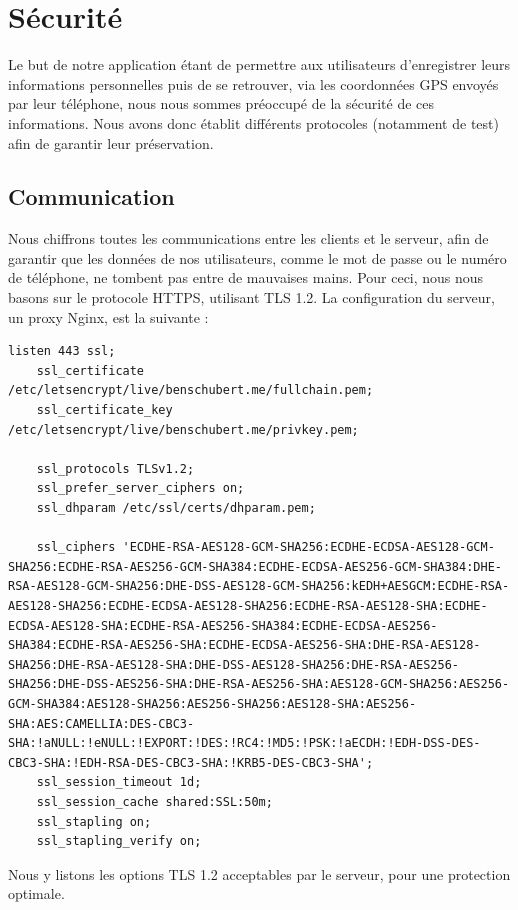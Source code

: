 \documentclass[french]{article}
\begin{document}
	\section{Sécurité}
	
	Le but de notre application étant de permettre aux utilisateurs d'enregistrer leurs informations personnelles puis de se retrouver, via les coordonnées GPS envoyés par leur téléphone, nous nous sommes préoccupé de la sécurité de ces informations. Nous avons donc établit différents protocoles (notamment de test) afin de garantir leur préservation.
	
	\subsection{Communication}
	
	Nous chiffrons toutes les communications entre les clients et le serveur, afin de garantir que les données de nos utilisateurs, comme le mot de passe ou le numéro de téléphone, ne tombent pas entre de mauvaises mains. Pour ceci, nous nous basons sur le protocole HTTPS, utilisant TLS 1.2. La configuration du serveur, un proxy Nginx, est la suivante :
	
	\begin{lstlisting}[style=py]
	listen 443 ssl;
	ssl_certificate /etc/letsencrypt/live/benschubert.me/fullchain.pem;
	ssl_certificate_key /etc/letsencrypt/live/benschubert.me/privkey.pem;
	
	ssl_protocols TLSv1.2;
	ssl_prefer_server_ciphers on;
	ssl_dhparam /etc/ssl/certs/dhparam.pem;
	
	ssl_ciphers 'ECDHE-RSA-AES128-GCM-SHA256:ECDHE-ECDSA-AES128-GCM-SHA256:ECDHE-RSA-AES256-GCM-SHA384:ECDHE-ECDSA-AES256-GCM-SHA384:DHE-RSA-AES128-GCM-SHA256:DHE-DSS-AES128-GCM-SHA256:kEDH+AESGCM:ECDHE-RSA-AES128-SHA256:ECDHE-ECDSA-AES128-SHA256:ECDHE-RSA-AES128-SHA:ECDHE-ECDSA-AES128-SHA:ECDHE-RSA-AES256-SHA384:ECDHE-ECDSA-AES256-SHA384:ECDHE-RSA-AES256-SHA:ECDHE-ECDSA-AES256-SHA:DHE-RSA-AES128-SHA256:DHE-RSA-AES128-SHA:DHE-DSS-AES128-SHA256:DHE-RSA-AES256-SHA256:DHE-DSS-AES256-SHA:DHE-RSA-AES256-SHA:AES128-GCM-SHA256:AES256-GCM-SHA384:AES128-SHA256:AES256-SHA256:AES128-SHA:AES256-SHA:AES:CAMELLIA:DES-CBC3-SHA:!aNULL:!eNULL:!EXPORT:!DES:!RC4:!MD5:!PSK:!aECDH:!EDH-DSS-DES-CBC3-SHA:!EDH-RSA-DES-CBC3-SHA:!KRB5-DES-CBC3-SHA';
	ssl_session_timeout 1d;
	ssl_session_cache shared:SSL:50m;
	ssl_stapling on;
	ssl_stapling_verify on;
	\end{lstlisting}
	
	Nous y listons les options TLS 1.2 acceptables par le serveur, pour une protection optimale.
	
\end{document}
